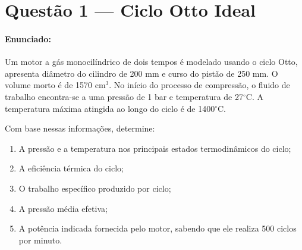 \newpage


\section*{Questão 1 — Ciclo Otto Ideal}
\label{sec:q_1}
\vspace{{10pt}}
\begin{{minipage}}{{\textwidth}}
\small
\paragraph{{Enunciado:}}
\begin{{verbatim}}
Um motor a gás monocilíndrico de dois tempos é modelado usando o ciclo Otto, apresenta
diâmetro do cilindro de 200 mm e curso do pistão de 250 mm. O volume morto é de 1570 cm$^3$.
No início do processo de compressão, o fluido de trabalho encontra-se a uma pressão de 1 bar e
temperatura de 27$^\circ$C. A temperatura máxima atingida ao longo do ciclo é de 1400$^\circ$C.

Com base nessas informações, determine:
\begin{enumerate}[label=\alph*)]
\item A pressão e a temperatura nos principais estados termodinâmicos do ciclo;
\item A eficiência térmica do ciclo;
\item O trabalho específico produzido por ciclo;
\item A pressão média efetiva;
\item A potência indicada fornecida pelo motor, sabendo que ele realiza 500 ciclos por minuto.
\end{enumerate}

\end{{verbatim}}
\end{{minipage}}
\vspace{{15pt}}
